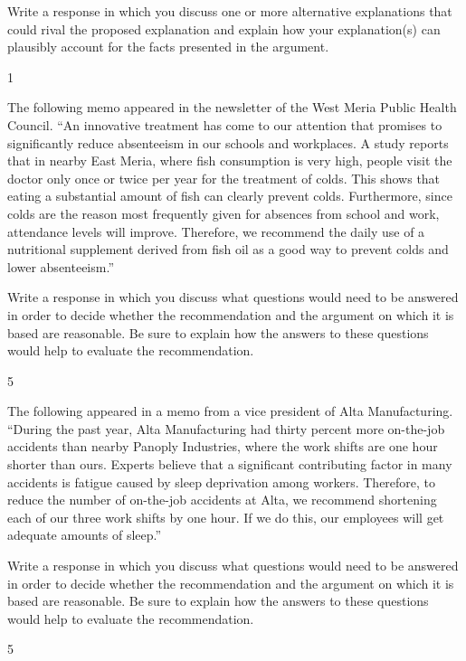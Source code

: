 \documentclass[]{article}
\begin{document}
Write a response in which you discuss one or more alternative
explanations that could rival the proposed explanation and explain how
your explanation(s) can plausibly account for the facts presented in the
argument.

1

The following memo appeared in the newsletter of the West Meria Public
Health Council. ``An innovative treatment has come to our attention that
promises to significantly reduce absenteeism in our schools and
workplaces. A study reports that in nearby East Meria, where fish
consumption is very high, people visit the doctor only once or twice per
year for the treatment of colds. This shows that eating a substantial
amount of fish can clearly prevent colds. Furthermore, since colds are
the reason most frequently given for absences from school and work,
attendance levels will improve. Therefore, we recommend the daily use of
a nutritional supplement derived from fish oil as a good way to prevent
colds and lower absenteeism.''

Write a response in which you discuss what questions would need to be
answered in order to decide whether the recommendation and the argument
on which it is based are reasonable. Be sure to explain how the answers
to these questions would help to evaluate the recommendation.

5

The following appeared in a memo from a vice president of Alta
Manufacturing. ``During the past year, Alta Manufacturing had thirty
percent more on-the-job accidents than nearby Panoply Industries, where
the work shifts are one hour shorter than ours. Experts believe that a
significant contributing factor in many accidents is fatigue caused by
sleep deprivation among workers. Therefore, to reduce the number of
on-the-job accidents at Alta, we recommend shortening each of our three
work shifts by one hour. If we do this, our employees will get adequate
amounts of sleep.''

Write a response in which you discuss what questions would need to be
answered in order to decide whether the recommendation and the argument
on which it is based are reasonable. Be sure to explain how the answers
to these questions would help to evaluate the recommendation.

5
\end{document}
